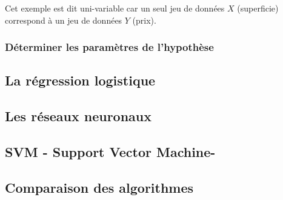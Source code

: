 Cet exemple est dit uni-variable car un seul jeu de données $X$ (superficie) correspond à un jeu de données $Y$ (prix).

\subsubsection{Déterminer les paramètres de l'hypothèse}
\label{Le Machine Learning:Les différents algorithmes d'apprentissage supervisé: La regression linéaire: Déterminer les paramètres de l'hypothèse}


\subsection{La régression logistique}
\label{ILe Machine Learning: Les différents algorithmes: La regression logistique}

\subsection{Les réseaux neuronaux}
\label{ILe Machine Learning: Les différents algorithmes: Les réseaux neuronaux}

\subsection{SVM - Support Vector Machine-}
\label{ILe Machine Learning: Les différents algorithmes: SVM}

\subsection{Comparaison des algorithmes}
\label{ILe Machine Learning: Les différents algorithmes: Comparaison des algorithmes}